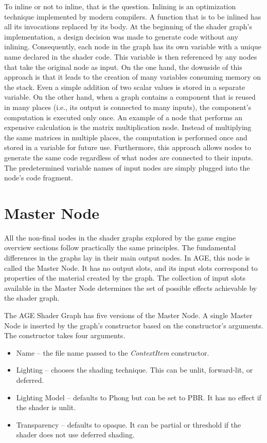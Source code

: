 \documentclass[
  digital,     %
  oneside,     %
  nosansbold,  %
  nocolorbold, %
  lof,         %
  lot,         %
]{fithesis4}
\begin{document}
To inline or not to inline, that is the question. Inlining is an optimization technique
implemented by modern compilers. A function that is to be inlined has all its invocations
replaced by its body. At the beginning of the shader graph's implementation, a design
decision was made to generate code without any inlining. Consequently, each node in the graph has its own
variable with a unique name declared in the shader code. This variable is then
referenced by any nodes that take the original node as input. On the one hand,
the downside of this approach is that it leads to the creation of many variables consuming memory on the stack.
Even a simple addition of two scalar values is stored in a separate variable. On the other hand,
when a graph contains a component that is reused in many places (i.e., its output is connected to many inputs),
the component's computation is executed only once. An example of a node that performs an expensive
calculation is the matrix multiplication node. Instead of multiplying the same matrices in multiple
places, the computation is performed once and stored in a variable for future use. Furthermore,
this approach allows nodes to generate the same code regardless of what nodes are connected
to their inputs. The predetermined variable names of input nodes are simply plugged into
the node's code fragment.

\section{Master Node}
All the non-final nodes in the shader graphs explored by the game engine overview sections
follow practically the same principles.
The fundamental differences in the graphs lay in their main output nodes. In AGE, this node
is called the Master Node. It has no output slots, and its input slots correspond to properties
of the material created by the graph. The collection of input slots available in the Master Node
determines the set of possible effects achievable by the shader graph.

The AGE Shader Graph has five versions of the Master Node. A single Master Node
is inserted by the graph's constructor based on the constructor's arguments.
The constructor takes four arguments.
\begin{itemize}
    \item Name -- the file name passed to the \textit{ContextItem} constructor.
    \item Lighting -- chooses the shading technique. This can be unlit, forward-lit, or deferred.
    \item Lighting Model -- defaults to Phong but can be set to PBR. It has no effect if the shader is unlit.
    \item Transparency -- defaults to opaque. It can be partial or threshold if the shader does not use
    deferred shading.
\end{itemize}
\end{document}
